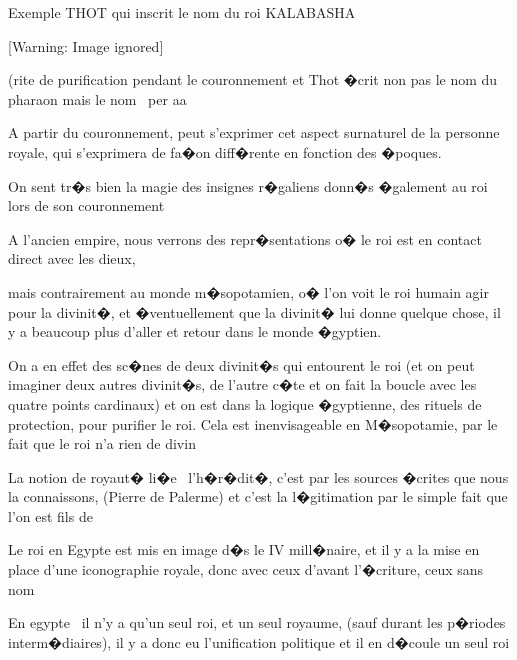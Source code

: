 \documentclass{article}
\begin{document}
\bigskip

Exemple THOT qui inscrit le nom du roi KALABASHA


\bigskip


\bigskip

  [Warning: Image ignored] %
 


\bigskip

(rite de purification pendant le couronnement et Thot �crit non pas le nom du pharaon mais le nom \ per aa


\bigskip

A partir du couronnement, peut s'exprimer cet aspect surnaturel de la personne royale, qui s'exprimera de fa�on diff�rente en fonction des �poques. 


\bigskip

On sent tr�s bien la magie des insignes r�galiens donn�s �galement au roi lors de son couronnement


\bigskip

A l'ancien empire, nous verrons des repr�sentations o� le roi est en contact direct avec les dieux, 

mais contrairement au monde m�sopotamien, o� l'on voit le roi humain agir pour la divinit�, et �ventuellement que la divinit� lui donne quelque chose, il y a beaucoup plus d'aller et retour dans le monde �gyptien.

On a en effet des sc�nes de deux divinit�s qui entourent le roi (et on peut imaginer deux autres divinit�s, de l'autre c�te et on fait la boucle avec les quatre points cardinaux) et on est dans la logique �gyptienne, des rituels de protection, pour purifier le roi. Cela est inenvisageable en M�sopotamie, par le fait que le roi n'a rien de divin


\bigskip

La notion de royaut� li�e \ l'h�r�dit�, c'est par les sources �crites que nous la connaissons, (Pierre de Palerme) et c'est la l�gitimation par le simple fait que l'on est fils de 


\bigskip

Le roi en Egypte est mis en image d�s le IV mill�naire, et il y a la mise en place d'une iconographie royale, donc avec ceux d'avant l'�criture, ceux sans nom


\bigskip


\bigskip

En egypte \ il n'y a qu'un seul roi, et un seul royaume, (sauf durant les p�riodes interm�diaires), il y a donc eu l'unification politique et il en d�coule un seul roi
\end{document}
